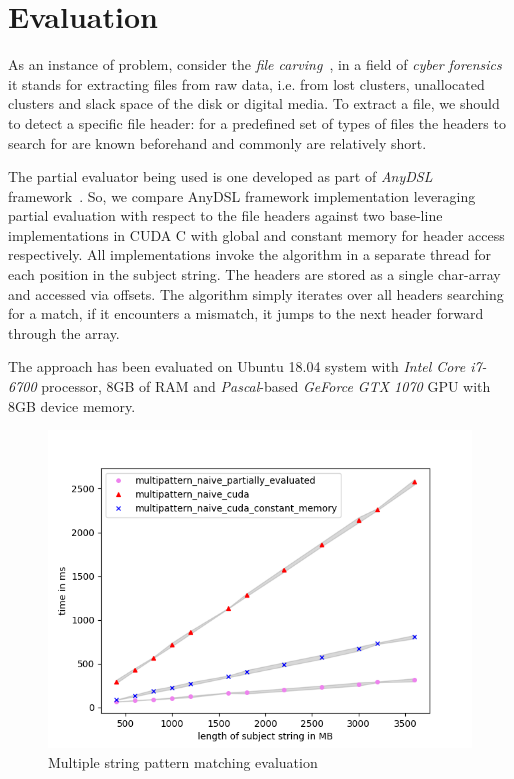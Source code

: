 \documentclass[sigplan,review,anonymous]{acmart}\settopmatter{printfolios=true,printccs=false,printacmref=false}
\newcommand\todo[1]{{\color{red}#1}}
\begin{document}




\section{Evaluation}

As an instance of problem, consider the \textit{file carving}~\cite{DataCarving}, in a field of \textit{cyber forensics} it stands for extracting files from raw data, i.e. from lost clusters, unallocated clusters and slack space of the disk or digital media.
To extract a file, we should to detect a specific file header: for a predefined set of types of files the headers to search for are known beforehand and commonly are relatively short.

The partial evaluator being used is one developed as part of \textit{AnyDSL} framework~\cite{LeiBa}.
So, we compare AnyDSL framework implementation leveraging partial evaluation with respect to the file headers against two base-line implementations in CUDA C with global and constant memory for header access respectively. 
All implementations invoke the algorithm in a separate thread for each position in the subject string.
The headers are stored as a single char-array and accessed via offsets.
The algorithm simply iterates over all headers searching for a match, if it encounters a mismatch, it jumps to the next header forward through the array.


The approach has been evaluated on Ubuntu 18.04 system with \textit{Intel Core i7-6700} processor, 8GB of RAM and \textit{Pascal}-based \textit{GeForce GTX 1070} GPU with 8GB device memory.

\begin{figure}[ht]
\centering
    \includegraphics[scale=0.5]{results_multipattern_final.png}
    \caption{Multiple string pattern matching evaluation}
    \label{fig:eval}
\end{figure}
\end{document}
